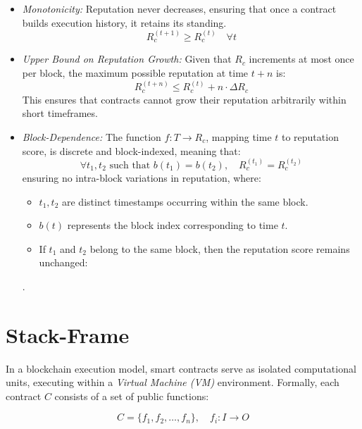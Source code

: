 \documentclass{article}
\begin{document}
\begin{itemize}
    \item \textit{Monotonicity:} Reputation never decreases, ensuring that once a contract builds execution history, it retains its standing.
    \begin{equation}
        R_c^{(t+1)} \geq R_c^{(t)} \quad \forall t
    \end{equation}
    
    \item \textit{Upper Bound on Reputation Growth:} Given that \( R_c \) increments at most once per block, the maximum possible reputation at time \( t+n \) is:
    \begin{equation}
        R_c^{(t+n)} \leq R_c^{(t)} + n \cdot \Delta R_c
    \end{equation}
    This ensures that contracts cannot grow their reputation arbitrarily within short timeframes.

    \item \textit{Block-Dependence:} The function \( f: T \to R_c \), mapping time \( t \) to reputation score, is discrete and block-indexed, meaning that:
    \begin{equation}
        \forall t_1, t_2 \text{ such that } b(t_1) = b(t_2), \quad R_c^{(t_1)} = R_c^{(t_2)}
    \end{equation}
    ensuring no intra-block variations in reputation, where:  
    \begin{itemize}
        \item \( t_1, t_2 \) are distinct timestamps occurring within the same block.
        \item \( b(t) \) represents the block index corresponding to time \( t \).
        \item If \( t_1 \) and \( t_2 \) belong to the same block, then the reputation score remains unchanged:  
    \end{itemize}.
\end{itemize}

\section{Stack-Frame}

In a blockchain execution model, smart contracts serve as isolated computational units, executing within a \textit{Virtual Machine (VM)} environment. Formally, each contract \( C \) consists of a set of public functions:

\begin{equation}
C = \{ f_1, f_2, \dots, f_n \}, \quad f_i: I \to O
\end{equation}
\end{document}
